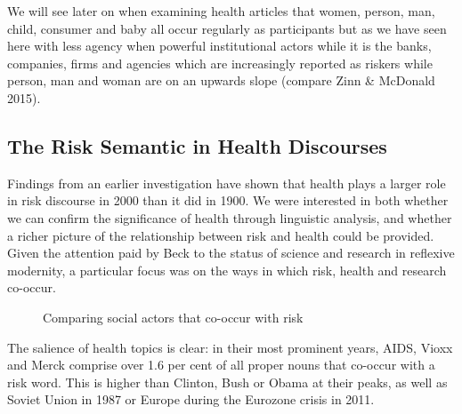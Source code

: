 We will see later on when examining health articles that women, person, man, child, consumer and baby all occur regularly as participants but as we have seen here with less agency when powerful institutional actors while it is the banks, companies, firms and agencies which are increasingly reported as riskers while person, man and woman are on an upwards slope (compare Zinn \& McDonald 2015).

\subsection{The Risk Semantic in Health Discourses}

Findings from an earlier investigation have shown that health plays a larger role in risk discourse in 2000 than it did in 1900. We were interested in both whether we can confirm the significance of health through linguistic analysis, and whether a richer picture of the relationship between risk and health could be provided. Given the attention paid by Beck to the status of science and research in reflexive modernity, a particular focus was on the ways in which risk, health and research co-occur. 

\begin{figure}[htb!]
\centering
{}
\caption{Comparing social actors that co-occur with risk}
\end{figure}

The salience of health topics is clear: in their most prominent years, AIDS, Vioxx and Merck comprise over 1.6 per cent of all proper nouns that co-occur with a risk word. This is higher than Clinton, Bush or Obama at their peaks, as well as Soviet Union in 1987 or Europe during the Eurozone crisis in 2011.

